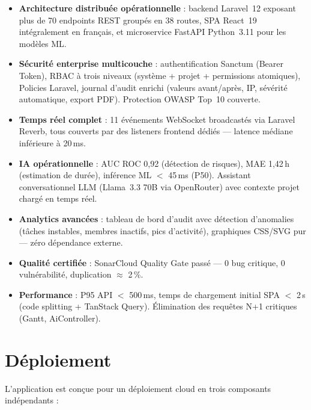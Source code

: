 \begin{itemize}
  \item \textbf{Architecture distribuée opérationnelle} : backend Laravel~12
        exposant plus de 70 endpoints REST groupés en 38 routes, SPA React~19
        intégralement en français, et microservice FastAPI Python~3.11 pour les
        modèles ML.
  \item \textbf{Sécurité enterprise multicouche} : authentification Sanctum
        (Bearer Token), RBAC à trois niveaux (système + projet + permissions
        atomiques), Policies Laravel, journal d'audit enrichi
        (valeurs avant/après, IP, sévérité automatique, export PDF). Protection
        OWASP Top~10 couverte.
  \item \textbf{Temps réel complet} : 11 événements WebSocket broadcastés via
        Laravel Reverb, tous couverts par des listeners frontend dédiés — latence
        médiane inférieure à 20\,ms.
  \item \textbf{IA opérationnelle} : AUC ROC 0,92 (détection de risques),
        MAE 1,42\,h (estimation de durée), inférence ML $<$ 45\,ms (P50).
        Assistant conversationnel LLM (Llama~3.3 70B via OpenRouter) avec
        contexte projet chargé en temps réel.
  \item \textbf{Analytics avancées} : tableau de bord d'audit avec détection
        d'anomalies (tâches instables, membres inactifs, pics d'activité),
        graphiques CSS/SVG pur — zéro dépendance externe.
  \item \textbf{Qualité certifiée} : SonarCloud Quality Gate passé ---
        0 bug critique, 0 vulnérabilité, duplication $\approx$ 2\,\%.
  \item \textbf{Performance} : P95 API $<$ 500\,ms, temps de chargement initial
        SPA $<$ 2\,s (code splitting + TanStack Query). Élimination des requêtes
        N+1 critiques (Gantt, AiController).
\end{itemize}

\section*{Déploiement}

L'application est conçue pour un déploiement cloud en trois composants indépendants :

